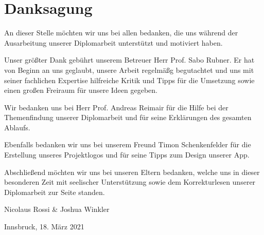 \section*{Danksagung}

An dieser Stelle möchten wir uns bei allen bedanken, die uns während der Ausarbeitung unserer Diplomarbeit unterstützt und motiviert haben.

Unser größter Dank gebührt unserem Betreuer Herr Prof. Sabo Rubner. Er hat von Beginn an uns geglaubt, unsere Arbeit regelmäßg begutachtet und uns mit seiner fachlichen Expertise hilfreiche Kritik und Tipps für die Umsetzung sowie einen großen Freiraum für unsere Ideen gegeben.

Wir bedanken uns bei Herr Prof. Andreas Reimair für die Hilfe bei der Themenfindung unserer Diplomarbeit und für seine Erklärungen des gesamten Ablaufs.

Ebenfalls bedanken wir uns bei unserem Freund Timon Schenkenfelder für die Erstellung unseres Projektlogos und für seine Tipps zum Design unserer App.

Abschließend möchten wir uns bei unseren Eltern bedanken, welche uns in dieser besonderen Zeit mit seelischer Unterstützung sowie dem Korrekturlesen unserer Diplomarbeit zur Seite standen.

\vspace{1cm}

Nicolaus Rossi \& Joshua Winkler

Innsbruck, 18. März 2021

\newpage